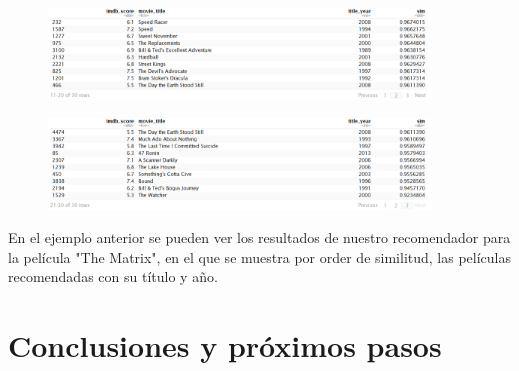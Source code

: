 \documentclass{article}
\begin{document}
\begin{figure}[h]
\centering
\includegraphics[width=4in,clip,keepaspectratio]{./images_latex/recommender2}
\end{figure}

\begin{figure}[h]
\centering
\includegraphics[width=4in,clip,keepaspectratio]{./images_latex/recommender3}
\end{figure}

En el ejemplo anterior se pueden ver los resultados de nuestro recomendador para la película "The Matrix", en el que se muestra por order de similitud, las películas recomendadas con su título y año. 

\clearpage

\section{Conclusiones y próximos pasos}

\blindtext

\clearpage
\end{document}
